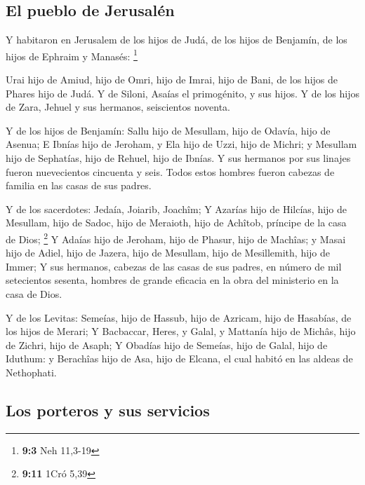 \hypertarget{el-pueblo-de-jerusaluxe9n}{%
\subsection{El pueblo de Jerusalén}\label{el-pueblo-de-jerusaluxe9n}}

 Y habitaron en Jerusalem de los hijos de Judá, de los hijos
de Benjamín, de los hijos de Ephraim y Manasés: \footnote{\textbf{9:3}
  Neh 11,3-19}

 Urai hijo de Amiud, hijo de Omri, hijo de Imrai, hijo de
Bani, de los hijos de Phares hijo de Judá.  Y de Siloni,
Asaías el primogénito, y sus hijos.  Y de los hijos de Zara,
Jehuel y sus hermanos, seiscientos noventa.

 Y de los hijos de Benjamín: Sallu hijo de Mesullam, hijo de
Odavía, hijo de Asenua;  E Ibnías hijo de Jeroham, y Ela
hijo de Uzzi, hijo de Michri; y Mesullam hijo de Sephatías, hijo de
Rehuel, hijo de Ibnías.  Y sus hermanos por sus linajes
fueron nuevecientos cincuenta y seis. Todos estos hombres fueron cabezas
de familia en las casas de sus padres.

 Y de los sacerdotes: Jedaía, Joiarib, Joachîm;
 Y Azarías hijo de Hilcías, hijo de Mesullam, hijo de
Sadoc, hijo de Meraioth, hijo de Achîtob, príncipe de la casa de Dios;
\footnote{\textbf{9:11} 1Cró 5,39}  Y Adaías hijo de
Jeroham, hijo de Phasur, hijo de Machîas; y Masai hijo de Adiel, hijo de
Jazera, hijo de Mesullam, hijo de Mesillemith, hijo de Immer;
 Y sus hermanos, cabezas de las casas de sus padres, en
número de mil setecientos sesenta, hombres de grande eficacia en la obra
del ministerio en la casa de Dios.

 Y de los Levitas: Semeías, hijo de Hassub, hijo de
Azricam, hijo de Hasabías, de los hijos de Merari;  Y
Bacbaccar, Heres, y Galal, y Mattanía hijo de Michâs, hijo de Zichri,
hijo de Asaph;  Y Obadías hijo de Semeías, hijo de Galal,
hijo de Iduthum: y Berachîas hijo de Asa, hijo de Elcana, el cual habitó
en las aldeas de Nethophati.

\hypertarget{los-porteros-y-sus-servicios}{%
\subsection{Los porteros y sus
servicios}\label{los-porteros-y-sus-servicios}}


